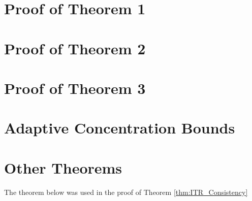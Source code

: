 
\ifnum{}
\section{Proof of Theorem 1}
\label{sec:theory_proof1_sm}

\ITRconsistencyPROOF
\eqnsteponePROOF
\fi

\section{Proof of Theorem 2}
\label{sec:theory_proof2_sm}



\ifnum{}
\section{Proof of Theorem 3}
\label{sec:theory_proof3_sm}

\fi


\ifnum{} %
\else
\ifnum{}
\section{Adaptive Concentration Bounds}

\fi
\section{Other Theorems}
The theorem below was used in the proof of Theorem \ref{thm:ITR_Consistency} %

\theoremconsistencylincomb
\fi

